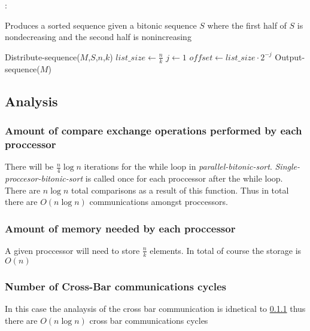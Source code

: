 \documentclass[12pt]{article}
\begin{document}
\begin{algorithm}[]
	:
	\caption{Produces a sorted sequence given a bitonic sequence $S$ where the first half of $S$ is nondecreasing 
	and the second half is nonincreasing}
	\SetAlgoLined
	\DontPrintSemicolon
	\LinesNumbered 
	Distribute-sequence($M$,$S$,$n$,$k$) \;
	$\textit{list\_size} \leftarrow \frac{n}{k}$ \;
	$j \leftarrow 1$\;
	$\textit{offset} \leftarrow \textit{list\_size} \cdot 2^{-j}$\;
	Output-sequence($M$)\;

\end{algorithm}
\newpage 

\subsection{Analysis}
\subsubsection{Amount of compare exchange operations performed by each proccessor} \label{op}
There will be $\frac{n}{4}\log n $ iterations for the while loop in \textit{parallel-bitonic-sort}.
\textit{Single-proccesor-bitonic-sort} is called once for each proccessor after the while loop.
There are $n \log n$ total comparisons as a result of this function. 
Thus in total there are  $O(n \log n )$ communications amongst proccessors.

\subsubsection{Amount of memory needed by each proccessor}
A given proccessor will need to store $\frac{n}{k}$ elements. In total of course the storage is
$O(n)$

\subsubsection{Number of Cross-Bar communications cycles }
In this case the analaysis of the cross bar communication is idnetical to \ref{op}
thus there are $O(n \log n) $ cross bar communications cycles
\end{document}
